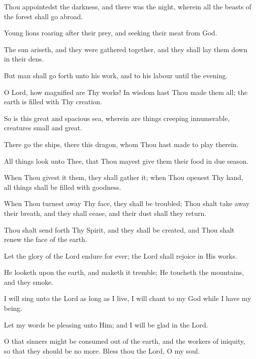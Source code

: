 Thou appointedst the darkness, and there was the night, wherein all the beasts of the forest shall go abroad.

Young lions roaring after their prey, and seeking their meat from God.

The sun ariseth, and they were gathered together, and they shall lay them down in their dens.

But man shall go forth unto his work, and to his labour until the evening.

O Lord, how magnified are Thy works! In wisdom hast Thou made them all; the earth is filled with Thy creation.

So is this great and spacious sea, wherein are things creeping innumerable, creatures small and great.

There go the ships, there this dragon, whom Thou hast made to play therein.

All things look unto Thee, that Thou mayest give them their food in due season.

When Thou givest it them, they shall gather it; when Thou openest Thy hand, all things shall be filled with goodness.

When Thou turnest away Thy face, they shall be troubled; Thou shalt take away their breath, and they shall cease, and their dust shall they return.

Thou shalt send forth Thy Spirit, and they shall be created, and Thou shalt renew the face of the earth.

Let the glory of the Lord endure for ever; the Lord shall rejoice in His works.

He looketh upon the earth, and maketh it tremble; He toucheth the mountains, and they smoke.

I will sing unto the Lord as long as I live, I will chant to my God while I have my being.

Let my words be pleasing unto Him; and I will be glad in the Lord.

O that sinners might be consumed out of the earth, and the workers of iniquity, so that they should be no more. Bless thou the Lord, O my soul.
